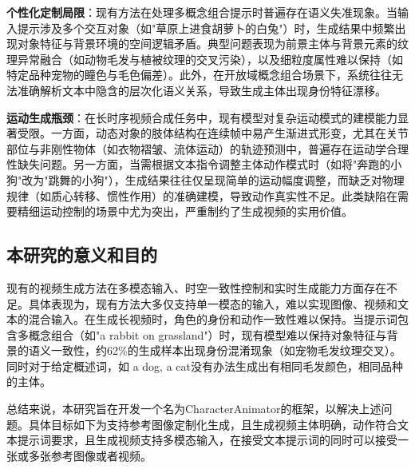 \textbf{个性化定制局限}：现有方法在处理多概念组合提示时普遍存在语义失准现象。当输入提示涉及多个交互对象（如"草原上进食胡萝卜的白兔"）时，生成结果中频繁出现对象特征与背景环境的空间逻辑矛盾。典型问题表现为前景主体与背景元素的纹理异常融合（如动物毛发与植被纹理的交叉污染），以及细粒度属性难以保持（如特定品种宠物的瞳色与毛色偏差）。此外，在开放域概念组合场景下，系统往往无法准确解析文本中隐含的层次化语义关系，导致生成主体出现身份特征漂移。

\textbf{运动生成瓶颈}：在长时序视频合成任务中，现有模型对复杂运动模式的建模能力显著受限。一方面，动态对象的肢体结构在连续帧中易产生渐进式形变，尤其在关节部位与非刚性物体（如衣物褶皱、流体运动）的轨迹预测中，普遍存在运动学合理性缺失问题。另一方面，当需根据文本指令调整主体动作模式时（如将"奔跑的小狗"改为"跳舞的小狗"），生成结果往往仅呈现简单的运动幅度调整，而缺乏对物理规律（如质心转移、惯性作用）的准确建模，导致动作真实性不足。此类缺陷在需要精细运动控制的场景中尤为突出，严重制约了生成视频的实用价值。

\subsection{本研究的意义和目的}
现有的视频生成方法在多模态输入、时空一致性控制和实时生成能力方面存在不足。具体表现为，现有方法大多仅支持单一模态的输入，难以实现图像、视频和文本的混合输入。在生成长视频时，角色的身份和动作一致性难以保持。当提示词包含多概念组合（如"a rabbit on grassland"）时，现有模型难以保持对象特征与背景的语义一致性，约62\%的生成样本出现身份混淆现象（如宠物毛发纹理交叉）。同时对于给定概述词，如 a dog, a cat没有办法生成出有相同毛发颜色，相同品种的主体。

总结来说，本研究旨在开发一个名为CharacterAnimator的框架，以解决上述问题。具体目标如下为支持参考图像定制化生成，且生成视频主体明确，动作符合文本提示词要求，且生成视频支持多模态输入，在接受文本提示词的同时可以接受一张或多张参考图像或者视频。

